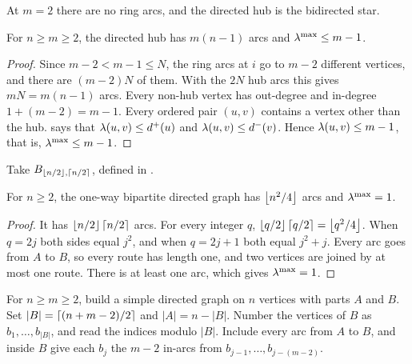 At $m = 2$ there are no ring arcs, and the directed hub is the bidirected star.

\begin{lemma}\label{lem:directed-hub-feasible}
For $n \ge m \ge 2$, the directed hub has $m(n-1)$ arcs and $\lambda^{\max} \le m-1$.
\end{lemma}

\begin{proof}
Since $m-2 < m-1 \le N$, the ring arcs at $i$ go to $m-2$ different vertices, and there are $(m-2)N$ of them. With the $2N$ hub arcs this gives $mN = m(n-1)$ arcs.
Every non-hub vertex has out-degree and in-degree $1 + (m-2) = m-1$.
Every ordered pair $(u,v)$ contains a vertex other than the hub.
 says that $\lambda(u,v) \le d^+(u)$ and $\lambda(u,v) \le d^-(v)$.
Hence $\lambda(u,v) \le m-1$, that is, $\lambda^{\max} \le m-1$.
\end{proof}

\begin{construction}\label{const:bipartite}
Take $B_{\left\lfloor n/2 \right\rfloor,\left\lceil n/2 \right\rceil}$, defined in .
\end{construction}

\begin{lemma}\label{lem:bipartite-feasible}
For $n \ge 2$, the one-way bipartite directed graph has $\left\lfloor n^2/4 \right\rfloor$ arcs and $\lambda^{\max} = 1$.
\end{lemma}

\begin{proof}
It has $\left\lfloor n/2 \right\rfloor\left\lceil n/2 \right\rceil$ arcs.
For every integer $q$, $\left\lfloor q/2 \right\rfloor\left\lceil q/2 \right\rceil=\left\lfloor q^2/4 \right\rfloor$. When $q=2j$ both sides equal $j^2$, and when $q=2j+1$ both equal $j^2+j$.
Every arc goes from $A$ to $B$, so every route has length one, and two vertices are joined by at most one route.
There is at least one arc, which gives $\lambda^{\max} = 1$.
\end{proof}

\begin{construction}\label{const:augmented-bipartite}
For $n \ge m \ge 2$, build a simple directed graph on $n$ vertices with parts $A$ and $B$. Set $|B| = \left\lceil (n+m-2)/2 \right\rceil$ and $|A| = n - |B|$. Number the vertices of $B$ as $b_1, \dots, b_{|B|}$, and read the indices modulo $|B|$. Include every arc from $A$ to $B$, and inside $B$ give each $b_j$ the $m-2$ in-arcs from $b_{j-1}, \dots, b_{j-(m-2)}$.
\end{construction}

